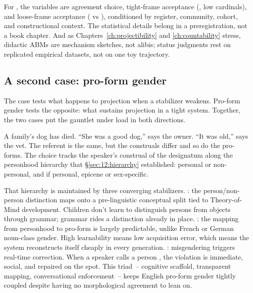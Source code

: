 For , the variables are agreement choice, tight-frame acceptance (, low cardinals), and loose-frame acceptance ( vs ), conditioned by register, community, cohort, and constructional context. The statistical details belong in a preregistration, not a book chapter. And as Chapters~\ref{ch:projectibility} and \ref{ch:countability} stress, didactic ABMs are mechanism sketches, not alibis; status judgments rest on replicated empirical datasets, not on one toy trajectory.

\subsection{A second case: pro-form gender}
\label{sec:17:gender-gauntlet}

The  case tests what happens to projection when a stabilizer weakens. Pro-form gender tests the opposite: what sustains projection in a tight system. Together, the two cases put the gauntlet under load in both directions.

A family's dog has died. \enquote{She was a good dog,} says the owner. \enquote{It was old,} says the vet. The referent is the same, but the construals differ and so do the pro-forms. The choice tracks the speaker's construal of the designatum along the personhood hierarchy that §\ref{sec:12:hierarchy} established: personal or non-personal, and if personal, epicene or sex-specific.

That hierarchy is maintained by three converging stabilizers. : the person/non-person distinction maps onto a pre-linguistic conceptual split tied to Theory-of-Mind development. Children don't learn to distinguish persons from objects through grammar; grammar rides a distinction already in place. : the mapping from personhood to pro-form is largely predictable, unlike French or German noun-class gender. High learnability means low acquisition error, which means the system reconstructs itself cheaply in every generation. : misgendering triggers real-time correction. When a speaker calls a person , the violation is immediate, social, and repaired on the spot. This triad~-- cognitive scaffold, transparent mapping, conversational enforcement~-- keeps English pro-form gender tightly coupled despite having no morphological agreement to lean on.

